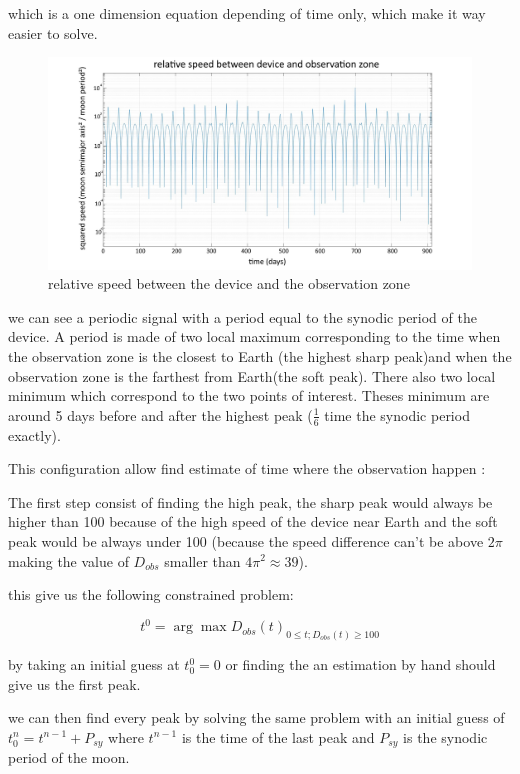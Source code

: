\documentclass[11pt]{article} %
\begin{document}
		which is a one dimension equation depending of time only, which make it way easier to solve.
		
		\begin{figure}[h]
			\includegraphics[width==1\textwidth]{images/graph.jpg}
			\caption{relative speed between the device and the observation zone}
		\end{figure}
		
		we can see a periodic signal with a period equal to the synodic period of the device. A period is made of two local maximum corresponding to the time when the observation zone is the closest to Earth (the highest sharp peak)and when the observation zone is the farthest from Earth(the soft peak). There also two local minimum which correspond to the two points of interest. Theses minimum are around 5 days before and after the highest peak ($\frac{1}{6}$ time the synodic period exactly). 
		
		This configuration allow find estimate of time where the observation happen : 
		
		The first step consist of finding the high peak, the sharp peak would always be higher than 100 because of the high speed of the device near Earth and the soft peak would be always under 100 (because the speed difference can't be above $2\pi$ making the value of $D_{obs}$ smaller than $4\pi^2\approx 39$).
		
		this give us the following constrained problem:
		
		$$
		t^0=\arg \max D_{obs}(t)_{0\leq t ; D_{obs}(t)\geq100}
		$$
		
		by taking an initial guess at $t^0_0=0$ or finding the an estimation by hand should give us the first peak.
		
		we can then find every peak by solving the same problem with an initial guess of $t^n_0=t^{n-1}+P_{sy}$ where $t^{n-1}$ is the time of the last peak and $P_{sy}$ is the synodic period of the moon.
		
\end{document}
